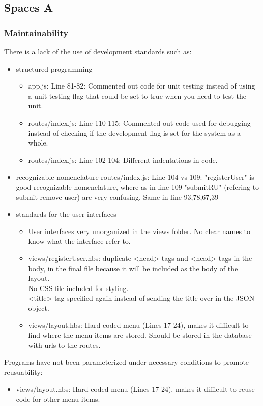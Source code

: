 
\subsection{Spaces A}

\subsubsection{Maintainability}
There is a lack of the use of development standards such as:
\begin{itemize}
	\item structured programming
		\begin{itemize}
			\item app.js: Line 81-82: Commented out code for unit testing instead of using a unit testing flag that could be set to true when you need to test the unit.
			\item routes/index.js: Line 110-115: Commented out code used for debugging instead of checking if the development flag is set for the system as a whole.
			\item routes/index.js: Line 102-104: Different indentations in code.
		\end{itemize}
	\item recognizable nomenclature
routes/index.js: Line 104 vs 109: "registerUser" is good recognizable nomenclature, where as in line 109 "submitRU" (refering to submit remove user) are very confusing. Same in line 93,78,67,39
	\item standards for the user interfaces
	\begin{itemize}
		\item User interfaces very unorganized in the views folder. No clear names to know what the interface refer to.
		\item views/registerUser.hbs: duplicate <head> tags and <head> tags in the body, in the final file because it will be included as the body of the layout. \\
		No CSS file included for styling. \\
		<title> tag specified again instead of sending the title over in the JSON object.
		\item views/layout.hbs: Hard coded menu (Lines 17-24), makes it difficult to find where the menu items are stored. Should be stored in the database with urls to the routes.
	\end{itemize}
\end{itemize}

Programs have not been parameterized under necessary conditions to promote reusuability:
\begin{itemize}
	\item views/layout.hbs: Hard coded menu (Lines 17-24), makes it difficult to reuse code for other menu items.
\end{itemize}

